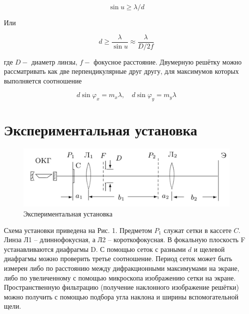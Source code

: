 \documentclass[12pt,a4paper]{article}
\begin{document}
    \begin{equation}
    \sin u \geq \lambda / d
    \end{equation}
    
    Или
    
    \begin{equation}
    d \geq \frac{\lambda}{\sin u} \approx \frac{\lambda}{D / 2 f}
    \end{equation}
    
    где $D-$ диаметр линзы, $f-$ фокусное расстояние. Двумерную решётку можно рассматривать как две перпендикулярные друг другу, для максимумов которых выполняется соотношение
    
    \begin{equation}
        d \sin \varphi_{x}=m_{x} \lambda, \quad d \sin \varphi_{y}=m_{y} \lambda
    \end{equation}


 
	\section*{Экспериментальная установка}

    \begin{figure}[h!]
    	\centering
    	\includegraphics[width=\linewidth]{res/scheme}
    	\caption{Экспериментальная установка}
    	\label{lab}
    \end{figure}
    
    Схема установки приведена на Рис. 1. Предметом $P_{1}$ служат сетки в кассете $C .$ \\Линза Л1 -- длиннофокусная, а Л2 -- короткофокусная. В фокальную плоскость F устанавливаются диафрагмы D. С помощью сеток с разными $d$ и щелевой диафрагмы можно проверить третье соотношение. Период сеток может быть измерен либо по расстоянию между дифракционными максимумами на экране, либо по увеличенному с помощью микроскопа изображению сетки на экране. Пространственную фильтрацию (получение наклонного изображение решётки) можно получить с помощью подбора угла наклона и ширины вспомогательной щели.
\end{document}
